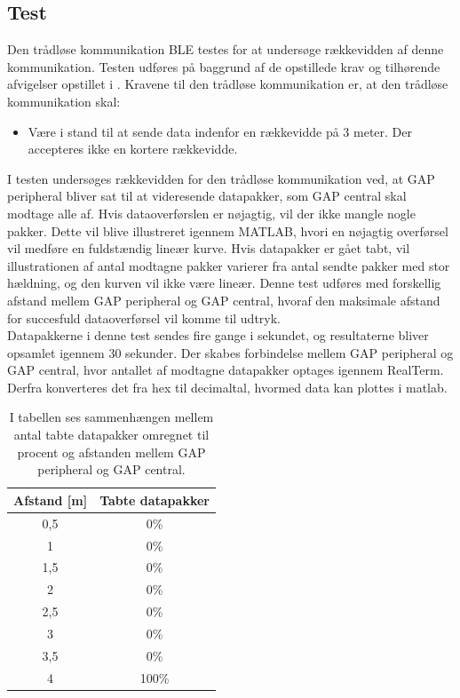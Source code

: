 \subsection{Test}
Den trådløse kommunikation BLE testes for at undersøge rækkevidden af denne kommunikation. Testen udføres på baggrund af de opstillede krav og tilhørende afvigelser opstillet i . Kravene til den trådløse kommunikation er, at den trådløse kommunikation skal:
\begin{itemize}
	\item Være i stand til at sende data indenfor en rækkevidde på 3 meter. Der accepteres ikke en kortere rækkevidde.
\end{itemize}

I testen undersøges rækkevidden for den trådløse kommunikation ved, at GAP peripheral bliver sat til at videresende datapakker, som GAP central skal modtage alle af. Hvis dataoverførslen er nøjagtig, vil der ikke mangle nogle pakker. Dette vil blive illustreret igennem MATLAB, hvori en nøjagtig overførsel vil medføre en fuldstændig lineær kurve. Hvis datapakker er gået tabt, vil illustrationen af antal modtagne pakker varierer fra antal sendte pakker med stor hældning, og den kurven vil ikke være lineær. Denne test udføres med forskellig afstand mellem GAP peripheral og GAP central, hvoraf den maksimale afstand for succesfuld dataoverførsel vil komme til udtryk. \\
Datapakkerne i denne test sendes fire gange i sekundet, og resultaterne bliver opsamlet igennem 30 sekunder. Der skabes forbindelse mellem GAP peripheral og GAP central, hvor antallet af modtagne datapakker optages igennem RealTerm. Derfra konverteres det fra hex til decimaltal, hvormed data kan plottes i matlab.
\begin{table}[H]
	\centering
	\begin{tabular}{cc}
			\hline
		\rowcolor[HTML]{C0C0C0} 
		Afstand {[}m{]} & Tabte datapakker \\ 	\hline
		0,5 	& 0\% \\ 	\hline
		1 		& 0\% \\	\hline
		1,5 	& 0\% \\	\hline
		2 		& 0\% \\	\hline
		2,5 	& 0\% \\	\hline
		3 		& 0\% \\	\hline
		3,5 	& 0\% \\	\hline
		4 		& 100\% \\	\hline
	\end{tabular}
	\caption{I tabellen ses sammenhængen mellem antal tabte datapakker omregnet til procent og afstanden mellem GAP peripheral og GAP central.}
	\label{test:ble_overforsel}
\end{table} \vspace{-.5cm}
